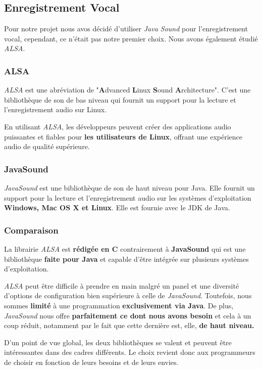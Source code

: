 \subsection{Enregistrement Vocal}
\label{subsec:Enregistrement}

Pour notre projet nous avos décidé d'utiliser \textit{Java Sound} pour l'enregistrement vocal, cependant,
ce n'était pas notre premier choix. Nous avons également étudié \textit{ALSA}.

\subsubsection*{ALSA}

\textit{ALSA} est une abréviation de "\textbf{A}dvanced \textbf{L}inux \textbf{S}ound \textbf{A}rchitecture". C'est une bibliothèque de son
de bas niveau qui fournit un support pour la lecture et l'enregistrement audio sur Linux.

En utilisant \textit{ALSA}, les développeurs peuvent créer des applications audio puissantes et fiables pour \textbf{les utilisateurs de Linux},
offrant une expérience audio de qualité supérieure.

\subsubsection*{JavaSound}

\textit{JavaSound} est une bibliothèque de son de haut niveau pour Java. Elle fournit un support pour la lecture et l'enregistrement audio sur
les systèmes d'exploitation \textbf{Windows, Mac OS X et Linux}. Elle est fournie avec le JDK de Java.

\subsubsection*{Comparaison}
La librairie \textit{ALSA} est \textbf{rédigée en C} contrairement à \textbf{JavaSound} qui est une bibliothèque
\textbf{faite pour Java} et capable d'être intégrée sur plusieurs systèmes d'exploitation.

\textit{ALSA} peut être difficile à prendre en main malgré un panel et une diversité d'options de configuration bien supérieure à celle de \textit{JavaSound}.
Toutefois, nous sommes \textbf{limité} à une programmation \textbf{exclusivement via Java}. De plus, \textit{JavaSound} nous offre \textbf{parfaitement ce
      dont nous avons besoin} et cela à un coup réduit, notamment par le fait que cette dernière est, elle, \textbf{de haut niveau.}

D'un point de vue global, les deux bibliothèques se valent et peuvent être intéressantes dans des cadres différents.
Le choix revient donc aux programmeurs de choisir en fonction de leurs besoins et de leurs envies.
